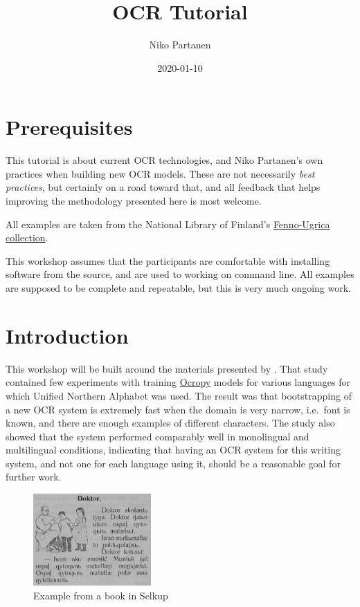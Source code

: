 \documentclass[]{book}
\title{OCR Tutorial}
\author{Niko Partanen}
\date{2020-01-10}
\begin{document}
\maketitle

{
\setcounter{tocdepth}{1}
\tableofcontents
}
\hypertarget{prerequisites}{%
\chapter{Prerequisites}\label{prerequisites}}

This tutorial is about current OCR technologies, and Niko Partanen's own practices when building new OCR models. These are not necessarily \emph{best practices}, but certainly on a road toward that, and all feedback that helps improving the methodology presented here is most welcome.

All examples are taken from the National Library of Finland's \href{https://fennougrica.kansalliskirjasto.fi/}{Fenno-Ugrica collection}.

This workshop assumes that the participants are comfortable with installing software from the source, and are used to working on command line. All examples are supposed to be complete and repeatable, but this is very much ongoing work.

\hypertarget{intro}{%
\chapter{Introduction}\label{intro}}

This workshop will be built around the materials presented by \citet{partanen2019ocr}. That study contained few experiments with training \href{https://github.com/tmbdev/ocropy}{Ocropy} models for various languages for which Unified Northern Alphabet was used. The result was that bootstrapping of a new OCR system is extremely fast when the domain is very narrow, i.e.~font is known, and there are enough examples of different characters. The study also showed that the system performed comparably well in monolingual and multilingual conditions, indicating that having an OCR system for this writing system, and not one for each language using it, should be a reasonable goal for further work.

\begin{figure}
\centering
\includegraphics[width=0.4\textwidth,height=\textheight]{images/doctor_sel.png}
\caption{Example from a book in Selkup}
\end{figure}
\end{document}
